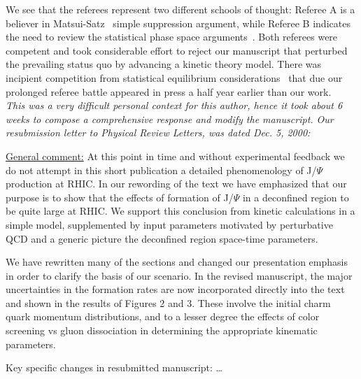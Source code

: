 We see that the referees represent two different schools of thought: Referee A is a believer in Matsui-Satz~\cite{Matsui:1986dk} simple suppression argument, while Referee B indicates the need to review the statistical phase space arguments~\cite{Gazdzicki:1999rk}. Both referees were competent and took considerable effort to reject our manuscript that perturbed the prevailing status quo by advancing a kinetic theory model. There was incipient competition from statistical equilibrium considerations~\cite{BraunMunzinger:2000px} that due our prolonged referee battle appeared in press a half year earlier than our work.\\

\noindent \textit{This was a very difficult personal context for this author, hence it took about 6 weeks to compose a comprehensive response and modify the manuscript. Our resubmission letter to Physical Review Letters, was dated Dec. 5, 2000:}\\[-0.7cm]
% 
\begin{mdframed}[linecolor=gray,roundcorner=12pt,backgroundcolor=Dandelion!15,linewidth=1pt,leftmargin=0cm,rightmargin=0cm,topline=true,bottomline=true,skipabove=12pt]\relax%
%
\underline{General comment:} At this point in time and without experimental feedback we do not attempt in this short publication a detailed phenomenology of J/$\Psi$ production at RHIC. In our rewording of the text we have emphasized that our purpose is to show that the effects of formation of J/$\Psi$ in a deconfined region to be quite large at RHIC. We support this conclusion from kinetic calculations in a simple model, supplemented by input parameters motivated by perturbative QCD and a generic picture the deconfined region space-time parameters. 

We have rewritten many of the sections and changed our presentation emphasis in order to clarify the basis of our scenario. In the revised manuscript, the major uncertainties in the formation rates are now incorporated directly into the text and shown in the results of Figures 2 and 3. These involve the initial charm quark momentum distributions, and to a lesser degree the effects of color screening vs gluon dissociation in determining the appropriate kinematic parameters.

{Key specific changes in resubmitted manuscript:} \ldots 
\end{mdframed} 

